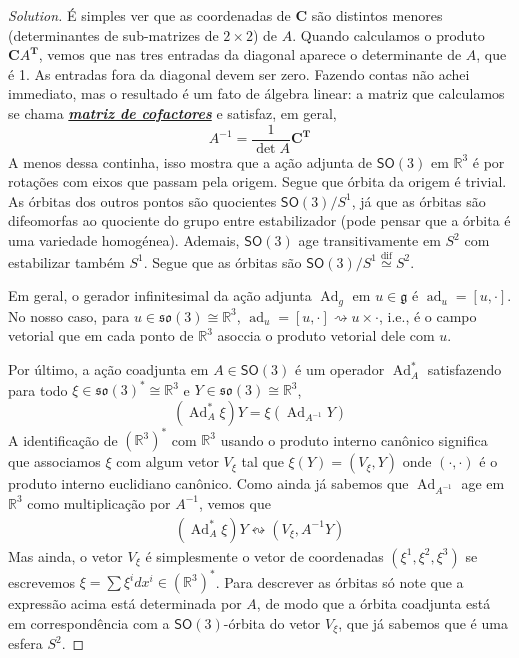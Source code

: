 \begin{proof}[Solution]
É simples ver que as coordenadas de $\mathbf{C}$ são distintos menores (determinantes de sub-matrizes de $2\times 2$) de $A$. Quando calculamos o produto $\mathbf{C} A^{\mathbf{T}}$, vemos que nas tres entradas da diagonal aparece o determinante de $A$, que é 1. As entradas fora da diagonal devem ser zero. Fazendo contas não achei immediato, mas o resultado é um fato de álgebra linear: a matriz que calculamos se chama \href{https://en.wikipedia.org/wiki/Minor_(linear_algebra)#Cofactor_expansion_of_the_determinant}{\textit{\textbf{matriz de cofactores}}} e satisfaz, em geral,
\[A^{-1}=\frac{1}{\det A}\mathbf{C}^{\mathbf{T}}\]
A menos dessa continha, isso mostra que a ação adjunta de $\mathsf{SO}(3)$ em $\mathbb{R}^{3}$ é por rotações com eixos que passam pela origem. Segue que órbita da origem é trivial. As órbitas dos outros pontos são quocientes $\mathsf{SO}(3)/S^1$, já que as órbitas são difeomorfas ao quociente do grupo entre estabilizador (pode pensar que a órbita é uma variedade homogénea). Ademais, $\mathsf{SO}(3)$ age transitivamente em $S^2$ com estabilizar também $S^1$. Segue que as órbitas são $\mathsf{SO}(3)/S^1\overset{\operatorname{dif}}{\simeq} S^2$.

Em geral, o gerador infinitesimal da ação adjunta $\operatorname{Ad}_g$ em $u\in\mathfrak{g}$ é $\operatorname{ad}_u=[u,\cdot]$. No nosso caso, para $u\in\mathfrak{so}(3) \cong \mathbb{R}^{3}$, $\operatorname{ad}_u=[u,\cdot ]\rightsquigarrow u\times \cdot$, i.e., é o campo vetorial que em cada ponto de $\mathbb{R}^{3}$ asoccia o produto vetorial dele com $u$.

Por último, a ação coadjunta em $A\in\mathsf{SO}(3)$ é um operador $\operatorname{Ad}^*_A$ satisfazendo para todo $\xi\in  \mathfrak{so}(3)^* \cong \mathbb{R}^{3}$ e $Y\in \mathfrak{so}(3) \cong \mathbb{R}^{3}$,
\[(\operatorname{Ad}^* _A\xi)Y=\xi(\operatorname{Ad}_{A^{-1}}Y)\]
A identificação de $(\mathbb{R}^3)^*$ com $\mathbb{R}^3$ usando o produto interno canônico significa que associamos $\xi$ com algum vetor $V_\xi$ tal que $\xi(Y)=(V_\xi,Y)$ onde $(\cdot,\cdot)$ é o produto interno euclidiano canônico. Como ainda já sabemos que $\operatorname{Ad}_{A^{-1}}$ age em $\mathbb{R}^{3}$ como multiplicação por $A^{-1}$, vemos que
\begin{align*}
	(\operatorname{Ad}^*_A\xi)Y \leftrightsquigarrow (V_\xi,A^{-1}Y)
\end{align*}
Mas ainda, o vetor $V_\xi$ é simplesmente o vetor de coordenadas $(\xi^1,\xi^2,\xi^3)$ se escrevemos $\xi=\sum \xi^idx^i\in (\mathbb{R}^3)^*$. Para descrever as órbitas só note que a expressão acima está determinada por $A$, de modo que a  órbita coadjunta está em correspondência com a $\mathsf{SO}(3)$-órbita do vetor $V_\xi$, que já sabemos que é uma esfera $S^2$.


\end{proof}
